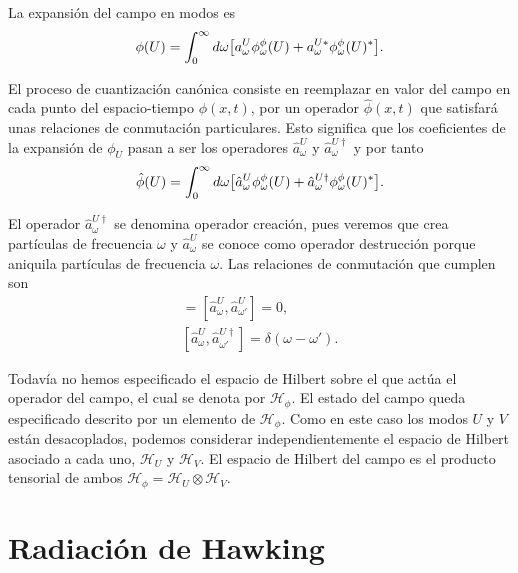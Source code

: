 La expansión del campo en modos es
\begin{equation}
\phi(U) = \int_0^\infty d\omega \qty[a_\omega^U \phi_\omega^\phi (U)+a_\omega^{U*} \phi_\omega^\phi (U)^*].
\end{equation}

El proceso de cuantización canónica consiste en reemplazar en valor del campo en cada
punto del espacio-tiempo $\phi(x,t)$, por un operador $\hat \phi(x,t)$ que satisfará unas
relaciones de conmutación particulares. 
Esto significa que los coeficientes de la expansión de $\phi_U$ pasan a ser los operadores
$\hat a_\omega^U$ y $\hat a_\omega^{U\dagger}$ y por tanto
\begin{equation}
  \hat \phi(U) = \int_0^\infty d\omega \qty[\hat a_\omega^U\phi_\omega^\phi (U)+\hat a_\omega^{U\dagger} \phi_\omega^\phi (U)^*].
\end{equation}

El operador $\hat a_\omega^{U\dagger}$ se denomina operador creación, pues veremos que crea 
partículas de frecuencia $\omega$ y $\hat a_\omega^U$ se conoce como operador destrucción porque
aniquila partículas de frecuencia $\omega$.
Las relaciones de conmutación que cumplen son
\begin{gather}
  [\hat a_\omega^{U\dagger},\hat a_{\omega'}^{U\dagger}]=[\hat a_\omega^U,\hat a_{\omega'}^U]=0, \\
  [\hat a_\omega^U,\hat a_{\omega'}^{U\dagger}]=\delta(\omega-\omega').
\end{gather}

Todavía no hemos especificado el espacio de Hilbert sobre el que actúa el operador del campo, el cual
se denota por $\mathcal H_\phi$. 
El estado del campo queda especificado descrito por un elemento de $\mathcal H_\phi$.
Como en este caso los modos $U$ y $V$ están desacoplados, podemos considerar independientemente el espacio
de Hilbert asociado a cada uno, $\mathcal H_U$ y $\mathcal H_V$.
El espacio de Hilbert del campo es el producto tensorial de ambos $\mathcal H_\phi=\mathcal H_U\otimes \mathcal H_V$.











\section{Radiación de Hawking}

